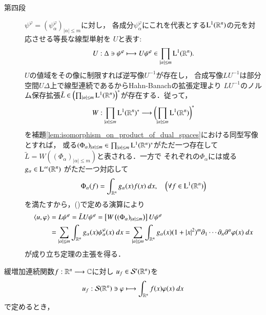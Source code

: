 \begin{prf}
\begin{description}
			\item[第四段]
				$\psi^\varphi = (\psi^\varphi_\alpha)_{|\alpha| \leq m}$に対し，
				各成分$\psi^\varphi_\alpha$にこれを代表とする$\mathrm{L}^1(\mathbb{R}^n)$の元を対応させる等長な線型単射を
				$U$と表す:
				\begin{align}
					U:\Delta \ni \psi^\varphi \longmapsto 
					U \psi^\varphi \in \prod_{|\alpha| \leq m} \mathrm{L}^1(\mathbb{R}^n).
				\end{align}
				$U$の値域をその像に制限すれば逆写像$U^{-1}$が存在し，
				合成写像$LU^{-1}$は部分空間$U\Delta$上で線型連続であるからHahn-Banachの拡張定理より
				$LU^{-1}$のノルム保存拡張$\tilde{L} \in \left( \prod_{|\alpha| \leq m} \mathrm{L}^1(\mathbb{R}^n) \right)^*$が存在する．従って，
				\begin{align}
					W:\prod_{|\alpha| \leq m} \mathrm{L}^1(\mathbb{R}^n)^* \longrightarrow 
					\biggl( \prod_{|\alpha| \leq m} \mathrm{L}^1(\mathbb{R}^n) \biggr)^*
				\end{align}
				を補題\ref{lem:isomorphism_on_product_of_dual_spaces}における同型写像とすれば，
				或る$(\Phi_\alpha)_{|\alpha| \leq m} \in \prod_{|\alpha| \leq m} \mathrm{L}^1(\mathbb{R}^n)^*$がただ一つ存在して$\tilde{L} = W \left((\Phi_\alpha)_{|\alpha| \leq m}\right)$と表される．一方で
				それぞれの$\Phi_\alpha$には或る$g_\alpha \in \mathrm{L}^\infty(\mathbb{R}^n)$
				がただ一つ対応して
				\begin{align}
					\Phi_\alpha (f) = \int_{\mathbb{R}^n} g_\alpha(x)f(x)\ dx,
					\quad \left( \forall f \in \mathrm{L}^1(\mathbb{R}^n) \right)
				\end{align}
				を満たすから，()で定める演算により
				\begin{align}
					\inprod<u,\varphi>
					&= L\psi^\varphi
					= \tilde{L}U\psi^\varphi
					= \left[ W \left((\Phi_\alpha)_{|\alpha| \leq m}\right) \right] U\psi^\varphi \\
					&= \sum_{|\alpha| \leq m} \int_{\R^n} g_\alpha(x) \psi^\varphi_\alpha(x)\ dx
					= \sum_{|\alpha| \leq m} \int_{\R^n} g_\alpha(x) (1+|x|^2)^m \partial_1 \cdots \partial_n\partial^\alpha \varphi(x)\ dx
				\end{align}
				が成り立ち定理の主張を得る．
				\QED
		\end{description}
	\end{prf}
	
	\begin{screen}
		\begin{thm}[緩増加連続関数と緩増加超関数の一対一対応]
			緩増加連続関数$f:\mathbb{R}^n \longrightarrow \mathbb{C}$に対し
			$u_f \in \mathcal{S}'(\mathbb{R}^n)$を
			\begin{align}
				u_f: \mathcal{S}(\mathbb{R}^n) \ni \varphi \longmapsto
				\int_{\mathbb{R}^n} f(x) \varphi(x)\ dx
			\end{align}
			で定めるとき，
		\end{thm}
	\end{screen}
	
